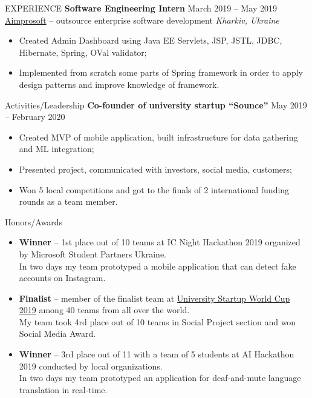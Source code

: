 \documentclass{resume} %
\begin{document}
\begin{rSection}{EXPERIENCE}
\textbf{Software Engineering Intern} \hfill March 2019 -- May 2019\\
\href{{https://www.aimprosoft.com/}}{Aimprosoft} -- outsource enterprise software development \hfill \textit{Kharkiv, Ukraine}
 \begin{itemize}[topsep=2pt, itemsep=7pt,parsep=-5pt]
     \item Created Admin Dashboard using Java EE Servlets, JSP, JSTL, JDBC, Hibernate, Spring, OVal validator;
     \item Implemented from scratch some parts of Spring framework in order to apply design patterns and improve knowledge of framework.
 \end{itemize}
\end{rSection} 

\begin{rSection}{Activities/Leadership} 
\textbf{Co-founder of university startup ``Sounce''} \hfill May 2019 -- February 2020
\begin{itemize}[topsep=2pt, itemsep=7pt,parsep=-5pt]
    \item Created MVP of mobile application, built infrastructure for data gathering and ML integration;
    \item Presented project, communicated with investors, social media, customers;
    \item Won 5 local competitions and got to the finals of 2 international funding rounds as a team member.
\end{itemize} 
\end{rSection}

\begin{rSection}{Honors/Awards} 
\begin{itemize}
    \item\textbf{Winner} -- 1st place out of 10 teams at IC Night Hackathon 2019 organized by Microsoft Student Partners Ukraine.\\ 
    In two days my team prototyped a mobile application that can detect fake accounts on Instagram.
    \item\textbf{Finalist} -- member of the finalist team at  \href{https://venturecup.dk/uswc/}{University Startup World Cup 2019} among 40 teams from all over the world.\\
    My team took 4rd place out of 10 teams in Social Project section and won Social Media Award.
     \item\textbf{Winner} -- 3rd place out of 11  with a team of 5 students at AI Hackathon 2019 conducted by local organizations. \\
     In two days my team prototyped an application for deaf-and-mute language translation in real-time.
\end{itemize}
\end{rSection}
\end{document}
